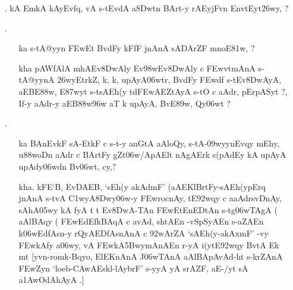 \def\DevnagVersion{2.15}\documentclass{article}
\begin{document}
\begin{itemize}
  \item[\dn\dnnum 1]. {\dn kA EmkA kAy\0Evf\?q, vA s\2-tEvdA a\38Dwtn\? BArt-y rAEyjFvn\? Env\0t\0Eyt\326wy, {\rs ?\re}}  
  
  \item[\dn\dnnum 2]. \begin{itemize} 
                        \item[\dn ka] {\dn s\2-tA@yyn\2 \3FEwEt BvdFy\? kFfF jnAnA\2 sADArZF mnoE\381w, {\rs ?\re}}
                        
                        \item[\dn kha] {\dn pAWfAlA mhAEv\38DwAly\? Ev\398wEv\38DwAly\? c \3FEwvt\0mAnA s\2-tA@yynA \326wyEtr\?k\?Z{\rs ,\re} k\4, k\4, upAyA\306wtr\4, BvdFy\? \3FEwd\?f\? s\2-tEv\38DwAyA, aEBE\388w, E\387wyt\?{\rs ,\re} s\2-tsAEh(y\? td\3FEwAEZtAyA\2 s\2-tO c aAdr, pErpASyt\? {\rs ?,\re} If-y aAdr-y aEB\388w\?\396w aT\?{\qvb} k\? upAyA, BvE\389w, Qy\306wt\? {\rs ?\re}}
                       \end{itemize}
                       
 \item[\dn\dnnum 3.] \begin{itemize}
                      \item[ka] {\dn BAnEvkF sA\2-EtkF c s\2-t-y anG\0tA aAloQy{\rs ,\re} s\2-tA{\rs -\re}\309wyynEvqy\? mEhy, u\388woDn aAdr\2 c BArtFy gZt\306w/ApAElt\? nAgAErk\? s(pAdEy\2 kA upAyA upAd\?y\306wd\?n Bv\306wt, cy\?,{\rs ?\re}}
                      
                      \item[kha.] {\dn kFE`B, EvDAEB, {\rs `\re}s\2Eh(y akAd\?mF{\rs '\re} {\rs (\re}aAEKlBrtFy{\rs -\re}sAEh(ypErq jnAnA\2 s\2-tvA \3C1wyA\38Dwy\306w-y \3FEwrocnAy{\rs ,\re} tE\392wqy\? c aaAdrs\2vD\0nAy{\rs ,\re} sAhA\305wy\2 kA\0 fyA t\? t\? Ev\38DwA-TAn\?  \3FEwEtEnEDtAn\2 s\2-tg\5\306wTAgA {\rs (\re} aAlBAqy\2 {\rs (\re} \3FEwEdEfkBAqA c avAd\4, shtAEn -vSpSyAEn  s\2-aZAEn k\?\306wEdfAsn-y rQyAEDfAsnAnA\2 c \392wAr\?ZA  {\rs `\re}sAEh(y{\rs -\re}akAx\?mF{\rs '\re} -vy\2 \3FEwkAfy\? a\306wy\4, vA \3FEwkA\35BwymAnAEn r-yA\0 i(y\?tE\392wqy\? BvtA\2 Ek mt {\rs [\re}yvn{\rs -\re}romk{\rs -\re}Bqyo, ElEKnAnA\2 J\306wTAnA aAlBApAvAd{\rs -\re}ht s\2-krZAnA\2 \3FEwZyn\?{\rs ,\re} {\rs `\re}loeb{\rs -\re}\3CAwAEskl{\rs -\re}lAyb\5rF{\rs '\re} s\2-yyA yA srAZF, aE-/yt\?{\rs ,\re} sA a\31AwOdAhAyA\0 .{\rs ]\re}}
                      

\end{itemize}
\end{itemize}
\end{document}

